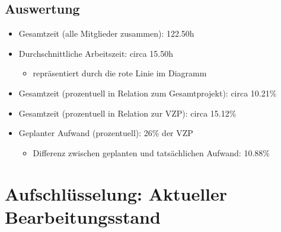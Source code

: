\documentclass[11pt,a4paper]{report}
\begin{document}
\subsection{Auswertung}

\begin{itemize}
\item Gesamtzeit (alle Mitglieder zusammen): 122.50h
\item Durchschnittliche Arbeitszeit: circa 15.50h
	\begin{itemize}
	\item repräsentiert durch die rote Linie im Diagramm
	\end{itemize}
\item Gesamtzeit (prozentuell in Relation zum Gesamtprojekt): circa 10.21\%
\item Gesamtzeit (prozentuell in Relation zur VZP): circa 15.12\%
\item Geplanter Aufwand (prozentuell): 26\% der VZP
	\begin{itemize}
	\item Differenz zwischen geplanten und tatsächlichen Aufwand: 10.88\%
	\end{itemize}
\end{itemize}

\newpage

\section{Aufschlüsselung: Aktueller Bearbeitungsstand}

\end{document}
